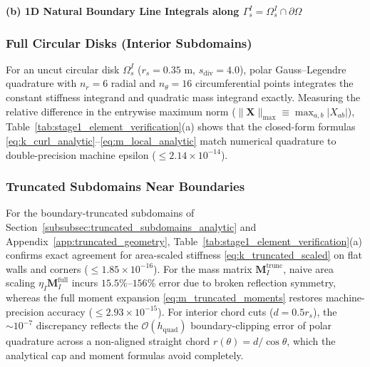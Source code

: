 \documentclass[VANCOUVER]{USG}
\begin{document}
\begin{table}[!t]
    \par\medskip
    \textbf{(b) 1D Natural Boundary Line Integrals along $\Gamma_s^I = \Omega_s^I \cap \partial\Omega$}\par\smallskip

\end{table}

\subsubsection{Full Circular Disks (Interior Subdomains)}
For an uncut circular disk $\Omega_s^I$ ($r_s = 0.35\text{ m}$, $s_{\mathrm{div}} = 4.0$), polar Gauss--Legendre quadrature with $n_r = 6$ radial and $n_\theta = 16$ circumferential points integrates the constant stiffness integrand and quadratic mass integrand exactly. Measuring the relative difference in the entrywise maximum norm ($\|\mathbf{X}\|_{\max} \equiv \max_{a,b} |X_{ab}|$), Table~\ref{tab:stage1_element_verification}(a) shows that the closed-form formulas \eqref{eq:k_curl_analytic}--\eqref{eq:m_local_analytic} match numerical quadrature to double-precision machine epsilon ($\le 2.14 \times 10^{-14}$).

\subsubsection{Truncated Subdomains Near Boundaries}
For the boundary-truncated subdomains of Section~\ref{subsubsec:truncated_subdomains_analytic} and Appendix~\ref{app:truncated_geometry}, Table~\ref{tab:stage1_element_verification}(a) confirms exact agreement for area-scaled stiffness \eqref{eq:k_truncated_scaled} on flat walls and corners ($\le 1.85 \times 10^{-16}$). For the mass matrix $\mathbf{M}_I^{\mathrm{trunc}}$, naive area scaling $\eta_I \mathbf{M}_I^{\mathrm{full}}$ incurs $15.5\%\text{--}156\%$ error due to broken reflection symmetry, whereas the full moment expansion \eqref{eq:m_truncated_moments} restores machine-precision accuracy ($\le 2.93 \times 10^{-15}$). For interior chord cuts ($d = 0.5 r_s$), the $\sim 10^{-7}$ discrepancy reflects the $\mathcal{O}(h_{\mathrm{quad}})$ boundary-clipping error of polar quadrature across a non-aligned straight chord $r(\theta) = d/\cos\theta$, which the analytical cap and moment formulas avoid completely.
\end{document}
